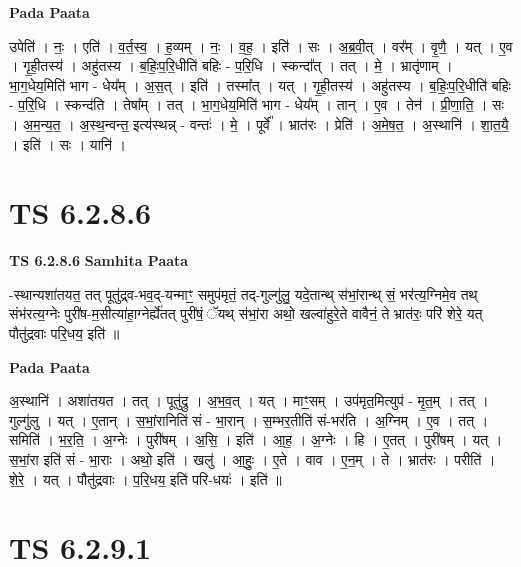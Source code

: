 \documentclass[17pt]{extarticle}
\begin{document}
\textbf{Pada Paata} \newline

उपेति॑ । नः॒ । एति॑ । व॒र्त॒स्व॒ । ह॒व्यम् । नः॒ । व॒ह॒ । इति॑ । सः । अ॒ब्र॒वी॒त् । वर᳚म् । वृ॒णै॒ । यत् । ए॒व । गृ॒ही॒तस्य॑ । अहु॑तस्य । ब॒हिः॒प॒रि॒धीति॑ बहिः - प॒रि॒धि । स्कन्दा᳚त् । तत् । मे॒ । भ्रातृ॑णाम् । भा॒ग॒धेय॒मिति॑ भाग - धेय᳚म् । अ॒स॒त् । इति॑ । तस्मा᳚त् । यत् । गृ॒ही॒तस्य॑ । अहु॑तस्य । ब॒हिः॒प॒रि॒धीति॑ बहिः - प॒रि॒धि । स्कन्द॑ति । तेषा᳚म् । तत् । भा॒ग॒धेय॒मिति॑ भाग - धेय᳚म् । तान् । ए॒व । तेन॑ । प्री॒णा॒ति॒ । सः । अ॒म॒न्य॒त॒ । अ॒स्थ॒न्वन्त॒ इत्य॑स्थन्न् - वन्तः॑ । मे॒ । पूर्वे᳚ । भ्रात॑रः । प्रेति॑ । अ॒मे॒ष॒त॒ । अ॒स्थानि॑ । शा॒त॒यै॒ । इति॑ । सः । यानि॑ ।  \newline





\section{ TS 6.2.8.6 }

\textbf{TS 6.2.8.6 } \newline
\textbf{Samhita Paata} \newline

-स्थान्यशा॑तयत॒ तत् पूतु॑द्र्व-भव॒द्-यन्माꣳ॒॒ समुप॑मृतं॒ तद्-गुल्गु॑लु॒ यदे॒तान्थ् स॑भां॒रान्थ् सं॒ भर॑त्य॒ग्निमे॒व तथ् संभ॑रत्य॒ग्नेः पुरी॑ष-म॒सीत्या॑हा॒ग्नेर्ह्ये॑तत् पुरी॑षं॒ ॅयथ् स॑भां॒रा अथो॒ खल्वा॑हुरे॒ते वावैनं॒ ते भ्रात॑रः॒ परि॑ शेरे॒ यत् पौतु॑द्रवाः परि॒धय॒ इति॑ ॥ \newline

\textbf{Pada Paata} \newline

अ॒स्थानि॑ । अशा॑तयत । तत् । पूतु॑द्रु । अ॒भ॒व॒त् । यत् । माꣳ॒॒सम् । उप॑मृत॒मित्युप॑ - मृ॒त॒म् । तत् । गुल्गु॑लु । यत् । ए॒तान् । स॒भां॒रानिति॑ सं - भा॒रान् । स॒म्भर॒तीति॑ सं-भर॑ति । अ॒ग्निम् । ए॒व । तत् । समिति॑ । भ॒र॒ति॒ । अ॒ग्नेः । पुरी॑षम् । अ॒सि॒ । इति॑ । आ॒ह॒ । अ॒ग्नेः । हि । ए॒तत् । पुरी॑षम् । यत् । स॒भां॒रा इति॑ सं - भा॒राः । अथो॒ इति॑ । खलु॑ । आ॒हुः॒ । ए॒ते । वाव । ए॒न॒म् । ते । भ्रात॑रः । परीति॑ । शे॒रे॒ । यत् । पौतु॑द्रवाः । प॒रि॒धय॒ इति॑ परि-धयः॑ । इति॑ ॥  \newline





\section{ TS 6.2.9.1 }
\end{document}
